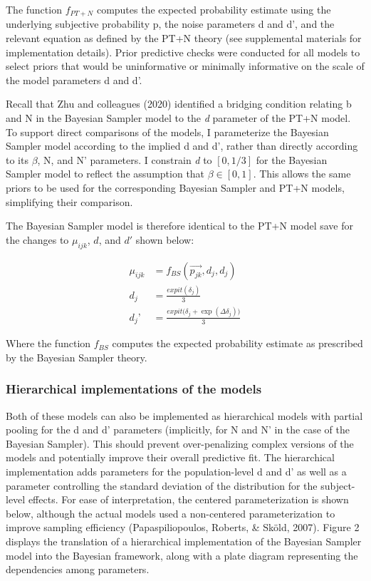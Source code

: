 \documentclass[
  english,
  man,floatsintext]{apa6}
\begin{document}
The function \(f_{PT+N}\) computes the expected probability estimate using the underlying subjective probability p, the noise parameters d and d', and the relevant equation as defined by the PT+N theory (see supplemental materials for implementation details). Prior predictive checks were conducted for all models to select priors that would be uninformative or minimally informative on the scale of the model parameters d and d'.

Recall that Zhu and colleagues (2020) identified a bridging condition relating b and N in the Bayesian Sampler model to the \emph{d} parameter of the PT+N model. To support direct comparisons of the models, I parameterize the Bayesian Sampler model according to the implied d and d', rather than directly according to its \(\beta\), N, and N' parameters. I constrain \emph{d} to \([0, 1/3]\) for the Bayesian Sampler model to reflect the assumption that \(\beta \in [0, 1]\). This allows the same priors to be used for the corresponding Bayesian Sampler and PT+N models, simplifying their comparison.

The Bayesian Sampler model is therefore identical to the PT+N model save for the changes to \(\mu_{ijk}\), \(d\), and \(d'\) shown below:

\begin{align*}
  \mu_{ijk} &= f_{BS}(\overrightarrow{p_{jk}}, d_j, d_j)  \\
  d_j &= \frac{expit(\delta_j)}{3} \\
  d_j’ &= \frac{expit\big(\delta_j + \exp(\Delta\delta_j)\big)}{3}
\end{align*}

Where the function \(f_{BS}\) computes the expected probability estimate as prescribed by the Bayesian Sampler theory.

\hypertarget{hierarchical-implementations-of-the-models}{%
\subsubsection{Hierarchical implementations of the models}\label{hierarchical-implementations-of-the-models}}

Both of these models can also be implemented as hierarchical models with partial pooling for the d and d' parameters (implicitly, for N and N' in the case of the Bayesian Sampler). This should prevent over-penalizing complex versions of the models and potentially improve their overall predictive fit. The hierarchical implementation adds parameters for the population-level d and d' as well as a parameter controlling the standard deviation of the distribution for the subject-level effects. For ease of interpretation, the centered parameterization is shown below, although the actual models used a non-centered parameterization to improve sampling efficiency (Papaspiliopoulos, Roberts, \& Sköld, 2007). Figure 2 displays the translation of a hierarchical implementation of the Bayesian Sampler model into the Bayesian framework, along with a plate diagram representing the dependencies among parameters.
\end{document}
